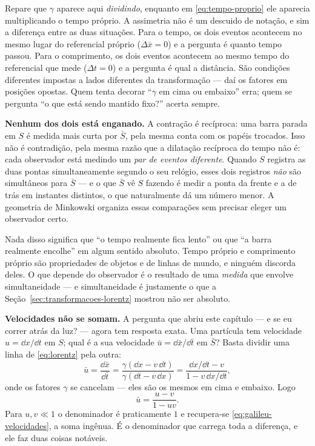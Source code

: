 \documentclass[12pt,a4paper,oneside]{book}
\theoremstyle{rgplain}
\theoremstyle{rgremark}
\begin{document}
\begin{atencao}
Repare que $\gamma$ aparece aqui \emph{dividindo}, enquanto em
\eqref{eq:tempo-proprio} ele aparecia multiplicando o tempo próprio. A
assimetria não é um descuido de notação, e sim a diferença entre as duas
situações. Para o tempo, os dois eventos acontecem no mesmo lugar do
referencial próprio ($\Delta \bar x=0$) e a pergunta é quanto tempo passou. Para o
comprimento, os dois eventos acontecem ao mesmo tempo do referencial que mede
($\Delta t=0$) e a pergunta é qual a distância. São condições diferentes
impostas a lados diferentes da transformação --- daí os fatores em posições
opostas. Quem tenta decorar ``$\gamma$ em cima ou embaixo'' erra; quem se
pergunta ``o que está sendo mantido fixo?'' acerta sempre.
\end{atencao}

\textbf{Nenhum dos dois está enganado.} A contração é recíproca: uma barra
parada em $S$ é medida mais curta por $\bar S$, pela mesma conta com os papéis
trocados. Isso não é contradição, pela mesma razão que a dilatação recíproca
do tempo não é: cada observador está medindo um \emph{par de eventos
diferente}. Quando $S$ registra as duas pontas simultaneamente segundo o seu
relógio, esses dois registros \emph{não} são simultâneos para $\bar S$ --- e o que
$\bar S$ vê $S$ fazendo é medir a ponta da frente e a de trás em instantes
distintos, o que naturalmente dá um número menor. A geometria de Minkowski
organiza essas comparações sem precisar eleger um observador certo.

\begin{atencao}
Nada disso significa que ``o tempo realmente fica lento'' ou que ``a barra
realmente encolhe'' em algum sentido absoluto. Tempo próprio e comprimento
próprio são propriedades de objetos e de linhas de mundo, e ninguém discorda
deles. O que depende do observador é o resultado de uma \emph{medida} que
envolve simultaneidade --- e simultaneidade é justamente o que a
Seção~\ref{sec:transformacoes-lorentz} mostrou não ser absoluto.
\end{atencao}

\textbf{Velocidades não se somam.} A pergunta que abriu este capítulo --- e se
eu correr atrás da luz? --- agora tem resposta exata. Uma partícula tem
velocidade $u=\dd x/\dd t$ em $S$; qual é a sua velocidade $\bar u=\dd \bar x/\dd \bar t$
em $\bar S$? Basta dividir uma linha de \eqref{eq:lorentz} pela outra:
\[
  \bar u=\frac{\dd \bar x}{\dd \bar t}
    =\frac{\gamma(\dd x-v\,\dd t)}{\gamma(\dd t-v\,\dd x)}
    =\frac{\dd x/\dd t-v}{1-v\,\dd x/\dd t},
\]
onde os fatores $\gamma$ se cancelam --- eles são os mesmos em cima e embaixo.
Logo
\begin{equation}
  \bar u=\frac{u-v}{1-uv}.
  \label{eq:composicao}
\end{equation}
Para $u,v\ll1$ o denominador é praticamente $1$ e recupera-se
\eqref{eq:galileu-velocidades}, a soma ingênua. É o denominador que carrega
toda a diferença, e ele faz duas coisas notáveis.
\end{document}
